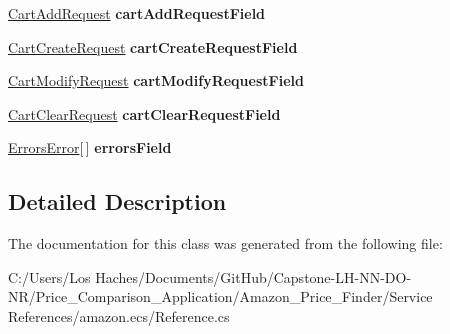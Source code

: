 \begin{DoxyCompactItemize}
\item 
\hypertarget{class_price___comparison_1_1amazon_1_1ecs_1_1_request_ad7d071f06d2364acb34e0810d4de1501}{\hyperlink{class_price___comparison_1_1amazon_1_1ecs_1_1_cart_add_request}{Cart\-Add\-Request} {\bfseries cart\-Add\-Request\-Field}}\label{class_price___comparison_1_1amazon_1_1ecs_1_1_request_ad7d071f06d2364acb34e0810d4de1501}

\item 
\hypertarget{class_price___comparison_1_1amazon_1_1ecs_1_1_request_a06e8d5cda75a0cd6b4b4420bc82f14d1}{\hyperlink{class_price___comparison_1_1amazon_1_1ecs_1_1_cart_create_request}{Cart\-Create\-Request} {\bfseries cart\-Create\-Request\-Field}}\label{class_price___comparison_1_1amazon_1_1ecs_1_1_request_a06e8d5cda75a0cd6b4b4420bc82f14d1}

\item 
\hypertarget{class_price___comparison_1_1amazon_1_1ecs_1_1_request_a511b36bcd9712c097dbf6943a5f0e3ca}{\hyperlink{class_price___comparison_1_1amazon_1_1ecs_1_1_cart_modify_request}{Cart\-Modify\-Request} {\bfseries cart\-Modify\-Request\-Field}}\label{class_price___comparison_1_1amazon_1_1ecs_1_1_request_a511b36bcd9712c097dbf6943a5f0e3ca}

\item 
\hypertarget{class_price___comparison_1_1amazon_1_1ecs_1_1_request_a5ae03f3ea726a392580b11420c8ec84e}{\hyperlink{class_price___comparison_1_1amazon_1_1ecs_1_1_cart_clear_request}{Cart\-Clear\-Request} {\bfseries cart\-Clear\-Request\-Field}}\label{class_price___comparison_1_1amazon_1_1ecs_1_1_request_a5ae03f3ea726a392580b11420c8ec84e}

\item 
\hypertarget{class_price___comparison_1_1amazon_1_1ecs_1_1_request_a001dd4eb19cb77d3f2bb90271ab47c0f}{\hyperlink{class_price___comparison_1_1amazon_1_1ecs_1_1_errors_error}{Errors\-Error}\mbox{[}$\,$\mbox{]} {\bfseries errors\-Field}}\label{class_price___comparison_1_1amazon_1_1ecs_1_1_request_a001dd4eb19cb77d3f2bb90271ab47c0f}

\end{DoxyCompactItemize}


\subsection{Detailed Description}


The documentation for this class was generated from the following file\-:\begin{DoxyCompactItemize}
\item 
C\-:/\-Users/\-Los Haches/\-Documents/\-Git\-Hub/\-Capstone-\/\-L\-H-\/\-N\-N-\/\-D\-O-\/\-N\-R/\-Price\-\_\-\-Comparison\-\_\-\-Application/\-Amazon\-\_\-\-Price\-\_\-\-Finder/\-Service References/amazon.\-ecs/Reference.\-cs\end{DoxyCompactItemize}
